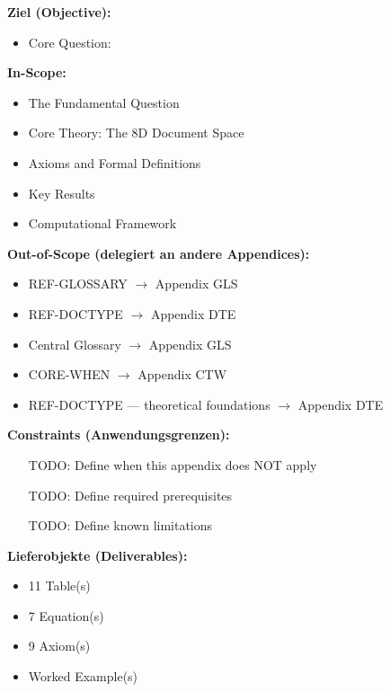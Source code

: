 \begin{tcolorbox}[
    colback=orange!5!white,
    colframe=orange!75!black,
    title={\textbf{Appendix Scope: Ziel / In-Scope / Out-of-Scope / Constraints}},
    fonttitle=\bfseries
]

\textbf{Ziel (Objective):}
\begin{itemize}[nosep]
    \item Core Question:
\end{itemize}

\textbf{In-Scope:}
\begin{itemize}[nosep]
    \item The Fundamental Question
    \item Core Theory: The 8D Document Space
    \item Axioms and Formal Definitions
    \item Key Results
    \item Computational Framework
\end{itemize}

\textbf{Out-of-Scope (delegiert an andere Appendices):}
\begin{itemize}[nosep]
    \item REF-GLOSSARY $\rightarrow$ Appendix GLS
    \item REF-DOCTYPE $\rightarrow$ Appendix DTE
    \item Central Glossary $\rightarrow$ Appendix GLS
    \item CORE-WHEN $\rightarrow$ Appendix CTW
    \item REF-DOCTYPE --- theoretical foundations $\rightarrow$ Appendix DTE
\end{itemize}

\textbf{Constraints (Anwendungsgrenzen):}
\begin{itemize}[nosep]
    \item [TODO: Define when this appendix does NOT apply]
    \item [TODO: Define required prerequisites]
    \item [TODO: Define known limitations]
\end{itemize}

\textbf{Lieferobjekte (Deliverables):}
\begin{itemize}[nosep]
    \item 11 Table(s)
    \item 7 Equation(s)
    \item 9 Axiom(s)
    \item Worked Example(s)
\end{itemize}

\end{tcolorbox}




